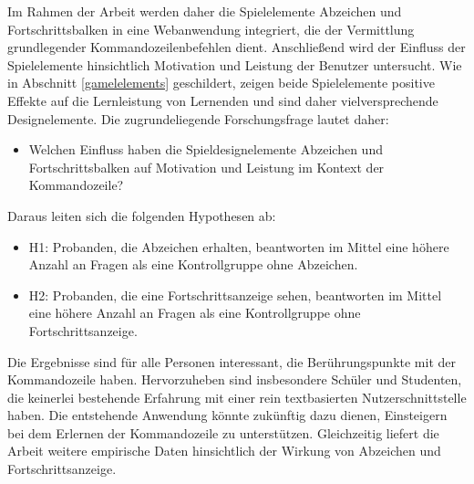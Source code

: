 Im Rahmen der Arbeit werden daher die Spielelemente Abzeichen und Fortschrittsbalken in eine Webanwendung integriert, die der Vermittlung grundlegender Kommandozeilenbefehlen dient. Anschließend wird der Einfluss der Spielelemente hinsichtlich Motivation und Leistung der Benutzer untersucht. Wie in Abschnitt \ref{gamelelements} geschildert, zeigen beide Spielelemente positive Effekte auf die Lernleistung von Lernenden und sind daher vielversprechende Designelemente. Die zugrundeliegende Forschungsfrage lautet daher:

\begin{itemize}
    \item Welchen Einfluss haben die Spieldesignelemente Abzeichen und Fortschrittsbalken auf Motivation und Leistung im Kontext der Kommandozeile?
\end{itemize}

Daraus leiten sich die folgenden Hypothesen ab:

\begin{itemize}
\item H1: Probanden, die Abzeichen erhalten, beantworten im Mittel eine höhere Anzahl an Fragen als eine Kontrollgruppe ohne Abzeichen.
\item H2: Probanden, die eine Fortschrittsanzeige sehen, beantworten im Mittel eine höhere Anzahl an Fragen als eine Kontrollgruppe ohne Fortschrittsanzeige.
\end{itemize}

Die Ergebnisse sind für alle Personen interessant, die Berührungspunkte mit der Kommandozeile haben.
Hervorzuheben sind insbesondere Schüler und Studenten, die keinerlei bestehende Erfahrung mit einer rein textbasierten Nutzerschnittstelle haben. Die entstehende Anwendung könnte zukünftig dazu dienen, Einsteigern bei dem Erlernen der Kommandozeile zu unterstützen. Gleichzeitig liefert die Arbeit weitere empirische Daten hinsichtlich der Wirkung von Abzeichen und Fortschrittsanzeige.